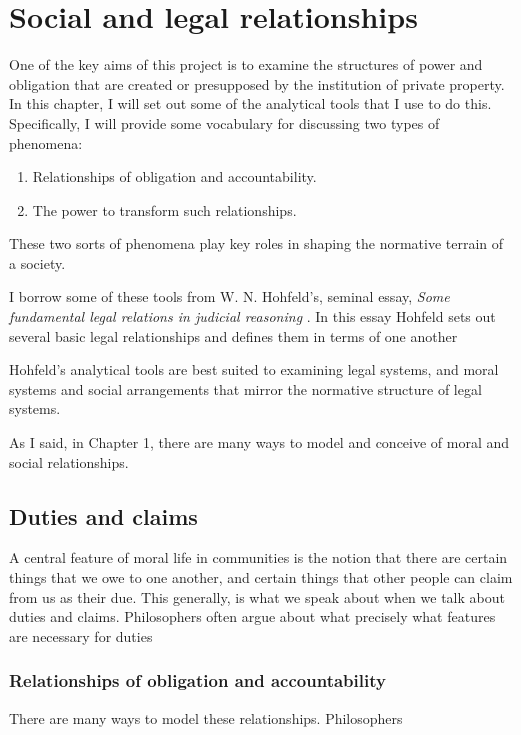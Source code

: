 \chapter{Social and legal relationships}\label{cha:soci-legal-relat}

One of the key aims of this project is to examine the structures of power and obligation that are created or presupposed by the institution of private property.
In this chapter, I will set out some of the analytical tools that I use to do this.
Specifically, I will provide some vocabulary for discussing two types of phenomena:
\begin{enumerate}
  \item Relationships of obligation and accountability.
  \item The power to transform such relationships. 
\end{enumerate}
These two sorts of phenomena play key roles in shaping the normative terrain of a society.

I borrow some of these tools from W. N. Hohfeld's, seminal essay, \emph{Some
fundamental legal relations in judicial reasoning}
\citeyearpar{hohfeldfundamentallegal1913}.
In this essay Hohfeld sets out several basic legal relationships and defines
them in terms of one another \citep[pp.
28--59]{hohfeldfundamentallegal1913}

Hohfeld's analytical tools are best suited to examining legal systems, and moral systems and social arrangements that mirror the normative structure of legal systems. 

As I said, in Chapter 1, there are many ways to model and conceive of moral and
social relationships.

\section{Duties and claims}\label{sec:duties-claims}
A central feature of moral life in communities is the notion that there are
certain things that we owe to one another, and certain things that other people can claim from us as their due.
This generally, is what we speak about when we talk about duties and claims.
Philosophers often argue about what precisely what features are necessary for duties

\subsection{Relationships of obligation and accountability}\label{sec:obl-acc}
There are many ways to model these relationships.
Philosophers


